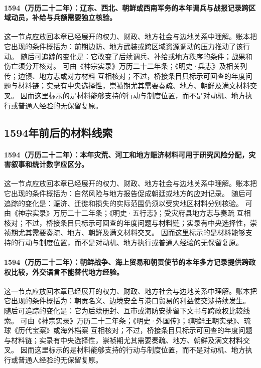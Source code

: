 \paragraph{1594（万历二十二年）：辽东、西北、朝鲜或西南军务的本年调兵与战报记录跨区域动员，补给与兵额需要独立核验。} 这一节点应放回本章已经展开的权力、财政、地方社会与边地关系中理解。账本把它出现的条件概括为：前期边防、地方武装或跨区域资源调动的压力推动了该行动。 随后可追踪的变化是：它改变了后续调兵、补给或地方秩序的条件；战果和伤亡须分开核对。 可由《神宗实录》万历二十二年条；《明史·兵志》及相关列传；边镇、地方志或对方材料 互相核对；不过，桥接条目只标示可回查的年度问题与材料链；实录有中央选择性，崇祯期尤其需要奏疏、地方、朝鲜及满文材料交叉。 因而这里标示的是材料能够支持的行动与制度位置，而不是对动机、地方执行或普通人经验的无保留复原。

\subsection{1594年前后的材料线索}

\paragraph{1594（万历二十二年）：本年灾荒、河工和地方赈济材料可用于研究风险分配，灾害叙事和统计数字应区分。} 这一节点应放回本章已经展开的权力、财政、地方社会与边地关系中理解。账本把它出现的条件概括为：自然风险与地方报告促成朝廷或地方的应对记录。 随后可追踪的变化是：赈济、迁徙和损失的实际范围仍须以受灾地区材料分别核验。 可由《神宗实录》万历二十二年条；《明史·五行志》；受灾府县地方志与奏疏 互相核对；不过，桥接条目只标示可回查的年度问题与材料链；实录有中央选择性，崇祯期尤其需要奏疏、地方、朝鲜及满文材料交叉。 因而这里标示的是材料能够支持的行动与制度位置，而不是对动机、地方执行或普通人经验的无保留复原。

\paragraph{1594（万历二十二年）：朝鲜战争、海上贸易和朝贡使节的本年多方记录提供跨政权比较，外交语言不能替代地方经验。} 这一节点应放回本章已经展开的权力、财政、地方社会与边地关系中理解。账本把它出现的条件概括为：朝贡名义、边境安全与港口贸易的利益使交涉持续发生。 随后可追踪的变化是：它为后续册封、互市或海防安排留下文书与跨政权比较线索。 可由《神宗实录》万历二十二年条；《明史·外国传》；《朝鲜王朝实录》、琉球《历代宝案》或海外档案 互相核对；不过，桥接条目只标示可回查的年度问题与材料链；实录有中央选择性，崇祯期尤其需要奏疏、地方、朝鲜及满文材料交叉。 因而这里标示的是材料能够支持的行动与制度位置，而不是对动机、地方执行或普通人经验的无保留复原。

